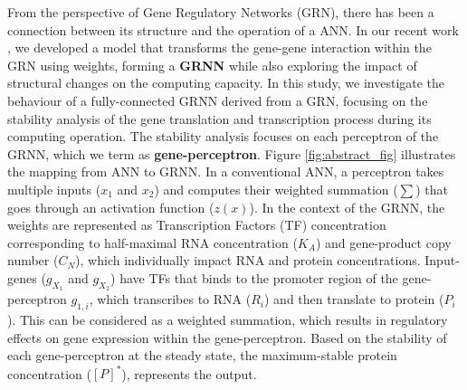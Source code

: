 \documentclass[twocolumn]{biophys-new}
\newcommand{\sm}[1]{\textcolor{brown}{#1}}
\begin{document}
{{%
From the perspective of Gene Regulatory Networks (GRN), there has been a connection between its structure and the operation of a ANN. In our recent work \cite{somathilaka2023revealing}, we developed a model that transforms the gene-gene interaction within the GRN using weights, forming a {\bf GRNN} while also exploring the impact of structural changes on the computing capacity. 
In this study, we investigate the behaviour of a fully-connected GRNN derived from a GRN, focusing on the stability analysis of the gene translation and transcription process during its computing operation. The stability analysis focuses on each perceptron of the GRNN, which we term as   \textbf{gene-perceptron}. Figure \ref{fig:abstract_fig}  illustrates the mapping from ANN to GRNN. 
In a conventional ANN, a perceptron takes multiple inputs ($x_1$ and $x_2$) and computes their weighted summation ($\sum$) that goes through an activation function ($z(x)$). 
In the context of the GRNN, the weights are represented as Transcription Factors (TF) concentration corresponding to half-maximal RNA concentration ($K_A$) and gene-product copy number ($C_N$), which   individually impact  RNA and protein concentrations. Input-genes ($g_{X_1}$ and $g_{X_2}$) have TFs that binds to the promoter region of the gene-perceptron $g_{1,i}$, which transcribes to RNA ($R_i$) and then translate to protein ($P_i$). This can be considered as a weighted summation, which results in regulatory effects on gene expression within the gene-perceptron. Based on the stability of each gene-perceptron at the steady state, the maximum-stable protein concentration ($[P]^*$), represents the output. %
   
}}
\end{document}
